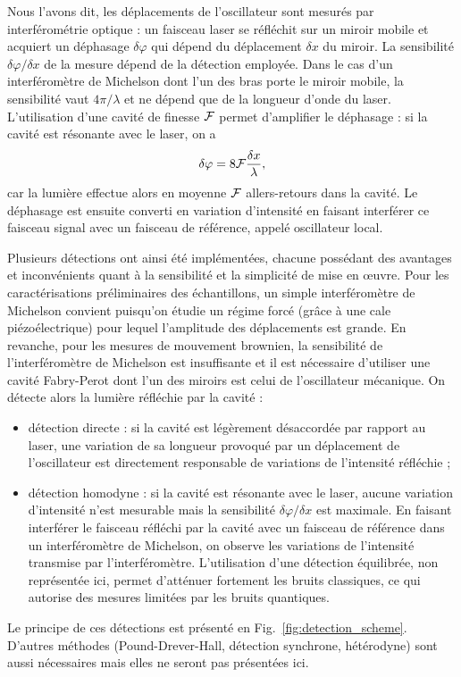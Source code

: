 \documentclass[12pt,a4paper]{article}
\begin{document}
Nous l'avons dit, les déplacements de l'oscillateur sont mesurés par interférométrie optique : un faisceau laser se réfléchit sur un miroir mobile et acquiert un déphasage $\delta\varphi$ qui dépend du déplacement $\delta x$ du miroir.
La sensibilité $\delta\varphi / \delta x$ de la mesure dépend de la détection employée.
Dans le cas d'un interféromètre de Michelson dont l'un des bras porte le miroir mobile, la sensibilité vaut $4\pi/\lambda$ et ne dépend que de la longueur d'onde du laser.
L'utilisation d'une cavité de finesse $\cal{F}$ permet d'amplifier le déphasage : si la cavité est résonante avec le laser, on a
\begin{equation}
\delta \varphi = 8{\cal{F}}\frac{\delta x}{\lambda},
\end{equation}
car la lumière effectue alors en moyenne ${\cal{F}}$ allers-retours dans la cavité.
Le déphasage est ensuite converti en variation d'intensité en faisant interférer ce faisceau signal avec un faisceau de référence, appelé oscillateur local.

Plusieurs détections ont ainsi été implémentées, chacune possédant des avantages et inconvénients quant à la sensibilité et la simplicité de mise en œuvre.
Pour les caractérisations préliminaires des échantillons, un simple interféromètre de Michelson convient puisqu'on étudie un régime forcé (grâce à une cale piézoélectrique) pour lequel l'amplitude des déplacements est grande.
En revanche, pour les mesures de mouvement brownien, la sensibilité de l'interféromètre de Michelson est insuffisante et il est nécessaire d'utiliser une cavité Fabry-Perot dont l'un des miroirs est celui de l'oscillateur mécanique.
On détecte alors la lumière réfléchie par la cavité :
\begin{itemize}
\item détection directe : si la cavité est légèrement désaccordée par rapport au laser, une variation de sa longueur provoqué par un déplacement de l'oscillateur est directement responsable de variations de l'intensité réfléchie ;
\item détection homodyne : si la cavité est résonante avec le laser, aucune variation d'intensité n'est mesurable mais la sensibilité $\delta\varphi/\delta x$ est maximale.
En faisant interférer le faisceau réfléchi par la cavité avec un faisceau de référence dans un interféromètre de Michelson, on observe les variations de l'intensité transmise par l'interféromètre.
L'utilisation d'une détection équilibrée, non représentée ici, permet d'atténuer fortement les bruits classiques, ce qui autorise des mesures limitées par les bruits quantiques. 
\end{itemize}
Le principe de ces détections est présenté en Fig.~\ref{fig:detection_scheme}.
D'autres méthodes (Pound-Drever-Hall, détection synchrone, hétérodyne) sont aussi nécessaires mais elles ne seront pas présentées ici.
\end{document}
